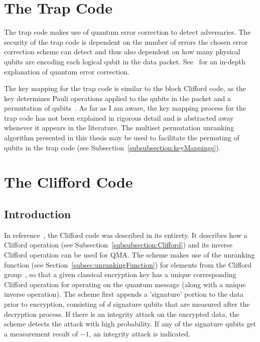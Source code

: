 \section{The Trap Code}
The trap code makes use of quantum error correction to detect adversaries. The security of the trap code is dependent on the number of errors the chosen error correction scheme can detect and thus also dependent on how many physical qubits are encoding each logical qubit in the data packet. See~\cite{nielsen2002quantum} for an in-depth explanation of quantum error correction.

The key mapping for the trap code is similar to the block Clifford code, as the key determines Pauli operations applied to the qubits in the packet and a permutation of qubits~\cite{broadbent2013quantum}. As far as I am aware, the key mapping process for the trap code has not been explained in rigorous detail and is abstracted away whenever it appears in the literature. The multiset permutation unranking algorithm presented in this thesis may be used to facilitate the permuting of qubits in the trap code (see Subsection~\ref{subsubsection:keyMappings}).



\section{The Clifford Code}
\label{sec:IntegrityDetectionUsingCliffordOperationEncryption}
\subsection{Introduction}
In reference~\cite{barbeau2022authenticity}, the Clifford code was described in its entirety. It describes how a Clifford operation (see Subsection~\ref{subsubsection:Clifford}) and its inverse Clifford operation can be used for QMA. The scheme makes use of the unranking function (see Section~\ref{subsec:unrankingFunction}) for elements from the Clifford group~\cite{Koenig2014}, so that a given classical encryption key has a unique corresponding Clifford operation for operating on the quantum message (along with a unique inverse operation). The scheme first appends a 'signature' portion to the data prior to encryption, consisting of $d$ signature qubits that are measured after the decryption process. If there is an integrity attack on the encrypted data, the scheme detects the attack with high probability. If any of the signature qubits get a measurement result of $-1$, an integrity attack is indicated.
